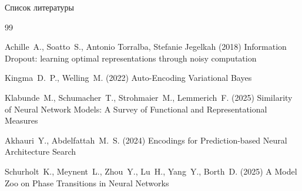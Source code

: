 \documentclass{beamer}
\begin{document}
\begin{frame}{Список литературы}
\begin{thebibliography}{99} 
    \footnotesize
    
        Achille~A., Soatto~S., Antonio Torralba, Stefanie Jegelkah (2018)
        \newblock Information Dropout: learning optimal representations through noisy computation

        Kingma~D.~P., Welling~M. (2022)
        \newblock Auto-Encoding Variational Bayes

        Klabunde~M., Schumacher~T., Strohmaier~M., Lemmerich~F. (2025)
        \newblock Similarity of Neural Network Models: A Survey of Functional and Representational Measures

        Akhauri~Y., Abdelfattah~M.~S. (2024)
        \newblock Encodings for Prediction-based Neural Architecture Search

        Schurholt~K., Meynent~L., Zhou~Y., Lu~H., Yang~Y., Borth~D. (2025)
        \newblock A Model Zoo on Phase Transitions in Neural Networks

\end{thebibliography}
\end{frame}
\end{document}
